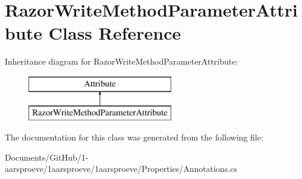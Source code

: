 \hypertarget{class_razor_write_method_parameter_attribute}{}\section{Razor\+Write\+Method\+Parameter\+Attribute Class Reference}
\label{class_razor_write_method_parameter_attribute}
Inheritance diagram for Razor\+Write\+Method\+Parameter\+Attribute\+:\begin{figure}[H]
\begin{center}
\leavevmode
\includegraphics[height=2.000000cm]{class_razor_write_method_parameter_attribute}
\end{center}
\end{figure}


The documentation for this class was generated from the following file\+:\begin{DoxyCompactItemize}
\item 
Documents/\+Git\+Hub/1-\/aarsproeve/1aarsproeve/1aarsproeve/\+Properties/Annotations.\+cs\end{DoxyCompactItemize}
